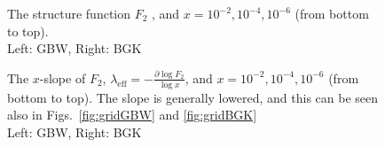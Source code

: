 \documentclass[11pt]{article}
\begin{document}
\begin{figure}[H]
\caption{The structure function $F_2$ , and $x=10^{-2}, 10^{-4}, 10^{-6}$ (from bottom to top).\\Left: GBW, Right: BGK}
\label{F2}
\end{figure}
\begin{figure}[H]
\caption{The $x$-slope of $F_2$,  $\lambda_\mathrm{eff}=-\frac{\partial \log F_2}{\log x}$,  and $x=10^{-2},10^{-4}, 10^{-6}$ (from bottom to top). The slope is generally lowered, and this can be seen also in Figs.~\ref{fig:gridGBW} and \ref{fig:gridBGK}\\Left: GBW, Right: BGK}
\label{slope}
\end{figure}
\end{document}
